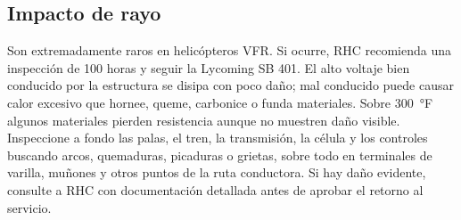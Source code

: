 \subsection{Impacto de rayo}

Son extremadamente raros en helicópteros VFR. Si ocurre, RHC recomienda una inspección de 100 horas y seguir la Lycoming SB 401. El alto voltaje bien conducido por la estructura se disipa con poco daño; mal conducido puede causar calor excesivo que hornee, queme, carbonice o funda materiales. Sobre 300~°F algunos materiales pierden resistencia aunque no muestren daño visible. Inspeccione a fondo las palas, el tren, la transmisión, la célula y los controles buscando arcos, quemaduras, picaduras o grietas, sobre todo en terminales de varilla, muñones y otros puntos de la ruta conductora. Si hay daño evidente, consulte a RHC con documentación detallada antes de aprobar el retorno al servicio.
